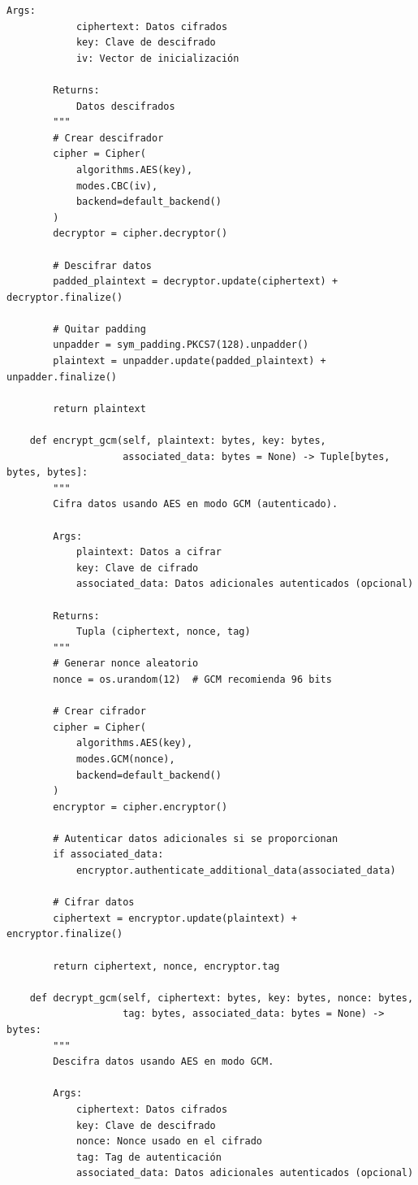 \documentclass[12pt,a4paper]{article}
\begin{document}
\begin{lstlisting}[caption=Implementación de cifrado simétrico con AES]
        Args:
            ciphertext: Datos cifrados
            key: Clave de descifrado
            iv: Vector de inicialización
            
        Returns:
            Datos descifrados
        """
        # Crear descifrador
        cipher = Cipher(
            algorithms.AES(key),
            modes.CBC(iv),
            backend=default_backend()
        )
        decryptor = cipher.decryptor()
        
        # Descifrar datos
        padded_plaintext = decryptor.update(ciphertext) + decryptor.finalize()
        
        # Quitar padding
        unpadder = sym_padding.PKCS7(128).unpadder()
        plaintext = unpadder.update(padded_plaintext) + unpadder.finalize()
        
        return plaintext
    
    def encrypt_gcm(self, plaintext: bytes, key: bytes, 
                    associated_data: bytes = None) -> Tuple[bytes, bytes, bytes]:
        """
        Cifra datos usando AES en modo GCM (autenticado).
        
        Args:
            plaintext: Datos a cifrar
            key: Clave de cifrado
            associated_data: Datos adicionales autenticados (opcional)
            
        Returns:
            Tupla (ciphertext, nonce, tag)
        """
        # Generar nonce aleatorio
        nonce = os.urandom(12)  # GCM recomienda 96 bits
        
        # Crear cifrador
        cipher = Cipher(
            algorithms.AES(key),
            modes.GCM(nonce),
            backend=default_backend()
        )
        encryptor = cipher.encryptor()
        
        # Autenticar datos adicionales si se proporcionan
        if associated_data:
            encryptor.authenticate_additional_data(associated_data)
        
        # Cifrar datos
        ciphertext = encryptor.update(plaintext) + encryptor.finalize()
        
        return ciphertext, nonce, encryptor.tag
    
    def decrypt_gcm(self, ciphertext: bytes, key: bytes, nonce: bytes, 
                    tag: bytes, associated_data: bytes = None) -> bytes:
        """
        Descifra datos usando AES en modo GCM.
        
        Args:
            ciphertext: Datos cifrados
            key: Clave de descifrado
            nonce: Nonce usado en el cifrado
            tag: Tag de autenticación
            associated_data: Datos adicionales autenticados (opcional)
            

\end{lstlisting}
\end{document}
